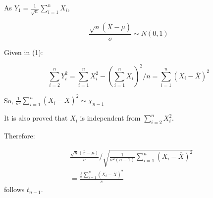 \documentclass{article}
\begin{document}
As \(Y_1=\frac{1}{\sqrt{n}}\sum_{i=1}^nX_i\),

\begin{equation}
    \frac{\sqrt{n}(\overline{X}-\mu)}{\sigma}\sim N(0,1)
\end{equation}

Given in (1):

\begin{equation}
    \sum_{i=2}^nY_i^2=\sum_{i=1}^{n}X_i^2-(\sum_{i=1}^nX_i)^2/n
    =\sum_{i=1}^n(X_i-\overline{X})^2
\end{equation}

So, \(\frac{1}{\sigma^2}\sum_{i=1}^n(X_i-\overline{X})^2\sim \chi_{n-1}\)

\vspace{3mm}

It is also proved that \(X_i\) is independent from \(\sum_{i=2}^nX_i^2\).

Therefore:

\begin{equation}
\begin{split}
&\frac{\sqrt{n}(\overline{x}-\mu)}{\sigma}/
\sqrt{\frac{1}{\sigma^2(n-1)}\sum_{i=1}^n(X_i-\overline{X})^2}\\
&=\frac{\frac{1}{\sigma}\sum_{i=1}^n(X_i-\overline{X})^2}{s}
\end{split}
\end{equation}
follows \(t_{n-1}\).
\end{document}

